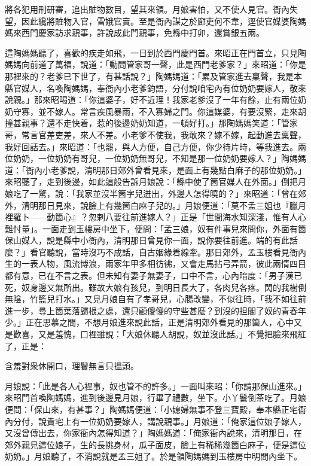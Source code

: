 將各犯用刑研審，追出賍物數目，望其來領。{}月娘害怕，又不使人見官。衙內失望，因此纔將賍物入官，雪娥官賣。至是衙內謀之於廊吏何不韋，逕使官媒婆陶媽媽來西門慶家訪求親事，許說成此門親事，免縣中打卯，還賞銀五兩。

這陶媽媽聽了，喜歡的疾走如飛，一日到於西門慶門首。來昭正在門首立，只見陶媽媽向前道了萬福，說道：「動問管家哥一聲，此是西門老爹家？」來昭道：「你是那裡來的？老爹已下世了，有甚話說？」陶媽媽道：「累及管家進去稟聲，我是本縣官媒人，名喚陶媽媽，奉衙內小老爹鈞語，分付說咱宅內有位奶奶要嫁人，敬來說親。」那來昭喝道：「你這婆子，好不近理！我家老爹沒了一年有餘，止有兩位奶奶守寡，並不嫁人。常言疾風暴雨，不入寡婦之門。你這媒婆，有要沒緊，走來胡撞甚親事？還不走快着，惹的後邊奶奶知道，一頓好打。」那陶媽媽笑道：「管家哥，常言官差吏差，來人不差。小老爹不使我，我敢來？嫁不嫁，起動進去稟聲，我好回話去。」來昭道：「也罷，與人方便，自己方便，你少待片時，等我進去。兩位奶奶，一位奶奶有哥兒，一位奶奶無哥兒，不知是那一位奶奶要嫁人？」陶媽媽道：「衙內小老爹說，清明那日郊外曾看見來，是面上有幾點白麻子的那位奶奶。」來昭聽了，走到後邊，如此這般告訴月娘說：「縣中使了箇官媒人在外面。」倒把月娘吃了一驚，說：「我家並沒半箇字兒迸出，外邊人怎得曉的？」來昭道：「曾在郊外，清明那日見來，說臉上有幾箇白麻子兒的。」月娘便道：「莫不孟三姐也『臘月裡羅卜——動箇心』？忽剌八要往前進嫁人？」正是「世間海水知深淺，惟有人心難忖量」。一面走到玉樓房中坐下，便問：「孟三娘，奴有件事兒來問你，外面有箇保山媒人，說是縣中小衙內，清明那日曾見你一面，說你要往前進。端的有此話麼？」{}看官聽說，當時沒巧不成話，自古姻緣着線牽。那日郊外，孟玉樓看見衙內生的一表人物，風流博浪，兩家年甲多相彷彿，又會走馬拈弓弄箭，彼此兩情四目都有意，已在不言之表。但未知有妻子無妻子，口中不言，心內暗度：「男子漢已死，奴身邊又無所出。雖故大娘有孩兒，到明日長大了，各肉兒各疼。閃的我樹倒無陰，竹籃兒打水。」又見月娘自有了孝哥兒，心腸改變，不似往時，「我不如往前進一步，尋上箇葉落歸根之處，還只顧傻傻的守些甚麼？到沒的担閣了奴的青春年少。」正在思慕之間，不想月娘進來說此話，正是清明郊外看見的那箇人，心中又是歡喜，又是羞愧，口裡雖說：「大娘休聽人胡說，奴並沒此話。」不覺把臉來飛紅了，{}正是：

\begin{myquote}
含羞對衆休開口，理鬢無言只搵頭。
\end{myquote}

月娘說：「此是各人心裡事，奴也管不的許多。」一面叫來昭：「你請那保山進來。」來昭門首喚陶媽媽，進到後邊見月娘，行畢了禮數，坐下。小丫鬟倒茶吃了。月娘便問：「保山來，有甚事？」陶媽媽便道：「小媳婦無事不登三寶殿，奉本縣正宅衙內分付，說貴宅上有一位奶奶要嫁人，講說親事。」月娘道：「俺家這位娘子嫁人，又沒曾傳出去，你家衙內怎得知道？」陶媽媽道：「俺家衙內說來，清明那日，在郊外親見這位娘子，生的長挑身材，瓜子面皮，臉上有稀稀幾箇白麻子，便是這位奶奶。」月娘聽了，不消說就是孟三姐了。於是領陶媽媽到玉樓房中明間內坐下。


